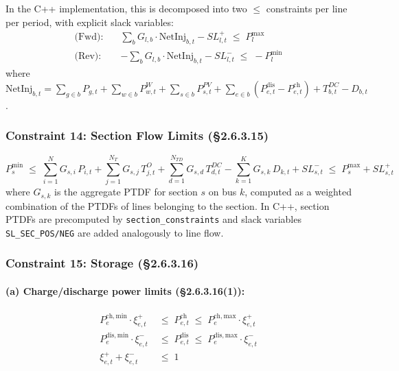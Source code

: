 In the C++ implementation, this is decomposed into two $\leq$ constraints
per line per period, with explicit slack variables:
\begin{align}
  \text{(Fwd):}\quad & \sum_b G_{l,b} \cdot \mathrm{NetInj}_{b,t}
  - SL^{+}_{l,t} \;\leq\; P^{\max}_l \label{eq:line-fwd}\\
  \text{(Rev):}\quad & -\sum_b G_{l,b} \cdot \mathrm{NetInj}_{b,t}
  - SL^{-}_{l,t} \;\leq\; -P^{\min}_l \label{eq:line-rev}
\end{align}
where $\mathrm{NetInj}_{b,t} = \sum_{g \in b} P_{g,t}
      + \sum_{w \in b} P^{W}_{w,t}
      + \sum_{s \in b} P^{PV}_{s,t}
      + \sum_{e \in b}(P^{\mathrm{dis}}_{e,t} - P^{\mathrm{ch}}_{e,t})
      + T^{DC}_{b,t} - D_{b,t}$.

\subsubsection{Constraint 14: Section Flow Limits (§2.6.3.15)}\label{sec:scuc-section}

\begin{equation}\label{eq:section-flow}
  P^{\min}_s
  \;\leq\;
  \sum_{i=1}^{N} G_{s,i}\, P_{i,t}
  + \sum_{j=1}^{N_T} G_{s,j}\, T^{O}_{j,t}
  + \sum_{d=1}^{N_{TD}} G_{s,d}\, T^{DC}_{d,t}
  - \sum_{k=1}^{K} G_{s,k}\, D_{k,t}
  + SL^{-}_{s,t}
  \;\leq\;
  P^{\max}_s + SL^{+}_{s,t}
\end{equation}
where $G_{s,k}$ is the aggregate PTDF for section $s$ on bus $k$,
computed as a weighted combination of the PTDFs of lines belonging to the
section. In C++, section PTDFs are precomputed by
\texttt{section\_constraints} and slack variables \texttt{SL\_SEC\_POS/NEG}
are added analogously to line flow.

\subsubsection{Constraint 15: Storage (§2.6.3.16)}\label{sec:scuc-storage}

\paragraph{(a) Charge/discharge power limits (§2.6.3.16(1)):}
\begin{align}
  P^{\mathrm{ch,min}}_e \cdot \xi^{+}_{e,t}
    &\;\leq\; P^{\mathrm{ch}}_{e,t} \;\leq\;
    P^{\mathrm{ch,max}}_e \cdot \xi^{+}_{e,t} \label{eq:sto-ch-lim}\\
  P^{\mathrm{dis,min}}_e \cdot \xi^{-}_{e,t}
    &\;\leq\; P^{\mathrm{dis}}_{e,t} \;\leq\;
    P^{\mathrm{dis,max}}_e \cdot \xi^{-}_{e,t} \label{eq:sto-dis-lim}\\
  \xi^{+}_{e,t} + \xi^{-}_{e,t} &\;\leq\; 1 \label{eq:sto-excl}
\end{align}

